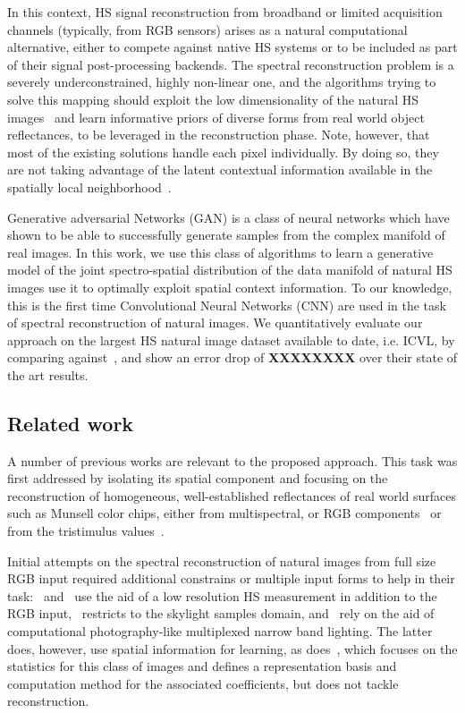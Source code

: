 \documentclass{bmvc2k}
\begin{document}
In this context, HS signal reconstruction from broadband or limited acquisition channels (typically, from RGB sensors) arises as a natural computational alternative, either to compete against native HS systems or to be included as part of their signal post-processing backends. 
The spectral reconstruction problem is a severely underconstrained, highly non-linear one, and the algorithms trying to solve this mapping should exploit the low dimensionality of the natural HS images~\cite{chakrabarti2011statistics} and learn informative priors of diverse forms from real world object reflectances, to be leveraged in the reconstruction phase.
Note, however, that most of the existing solutions handle each pixel individually.
By doing so, they are not taking advantage of the latent contextual information available in the spatially local neighborhood~\cite{chakrabarti2011statistics}.

Generative adversarial Networks (GAN) is a class of neural networks which have shown to be able to successfully generate samples from the complex manifold of real images.
In this work, we use this class of algorithms to learn a generative model of the joint spectro-spatial distribution of the data manifold of natural HS images use it to optimally exploit spatial context information.
To our knowledge, this is the first time Convolutional Neural Networks (CNN) are used in the task of spectral reconstruction of natural images.
We quantitatively evaluate our approach on the largest HS natural image dataset available to date, i.e. ICVL, by comparing against~\cite{arad_sparse_2016}, and show an error drop of \textbf{XXXXXXXX} over their state of the art results.

\subsection{Related work}
\label{sec:related}

A number of previous works are relevant to the proposed approach.
This task was first addressed by isolating its spatial component and focusing on the reconstruction of homogeneous, well-established reflectances of real world surfaces such as Munsell color chips, either from multispectral, or RGB components~\cite{heikkinen_evaluation_2008} or from the tristimulus values~\cite{ayala_use_2006}.

Initial attempts on the spectral reconstruction of natural images from full size RGB input required additional constrains or multiple input forms to help in their task:~\cite{kawakami_high-resolution_2011} and~\cite{cao_high_2011} use the aid of a low resolution HS measurement in addition to the RGB input,~\cite{lopez-alvarez_using_2008} restricts to the skylight samples domain, and~\cite{park_multispectral_2007,parmar_spatio-spectral_2008,goel_hypercam:_2015} rely on the aid of computational photography-like multiplexed narrow band lighting. The latter does, however, use spatial information for learning, as does~\cite{chakrabarti2011statistics}, which focuses on the statistics for this class of images and defines a representation basis and computation method for the associated coefficients, but does not tackle reconstruction.
\end{document}
